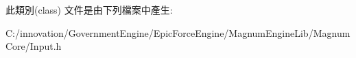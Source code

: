 此類別(class) 文件是由下列檔案中產生\+:\begin{DoxyCompactItemize}
\item 
C\+:/innovation/\+Government\+Engine/\+Epic\+Force\+Engine/\+Magnum\+Engine\+Lib/\+Magnum\+Core/Input.\+h\end{DoxyCompactItemize}
